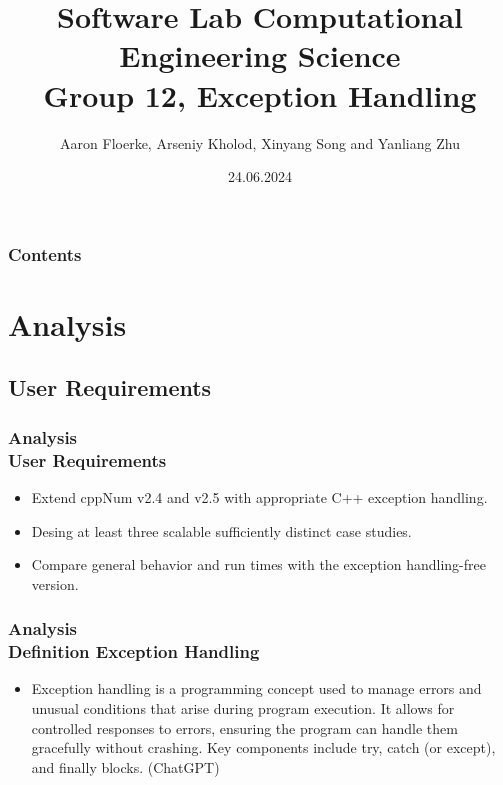 \documentclass[ucs,10pt]{beamer}
\begin{document}
\title[{\tt info@stce.rwth-aachen.de}]{\textcolor{rwth-blue}{Software Lab Computational Engineering Science} \vspace{.2cm} \\ {\small Group 12, Exception Handling}}
\author[Group 12)]{Aaron Floerke, Arseniy Kholod, Xinyang Song and Yanliang Zhu} 
\date[]{24.06.2024}

\begin{frame}[plain]
\titlepage
\end{frame}

\begin{frame}
	\frametitle{Contents}
\tableofcontents
\end{frame}

\section{Analysis}

\subsection{User Requirements}

\begin{frame}
\frametitle{Analysis \\
	\small \color{rwth-blue} User Requirements}
	\begin{itemize}
		\item Extend cppNum v2.4 and v2.5 with appropriate C++ exception handling.
		\item Desing at least three scalable sufficiently distinct case studies.
		\item Compare general behavior and run times with the exception handling-free version.
	\end{itemize}
\end{frame}

\begin{frame}
\frametitle{Analysis \\
	\small \color{rwth-blue} Definition Exception Handling}
	\begin{itemize}
		\item Exception handling is a programming concept used to manage errors and unusual conditions that arise during program execution. It allows for controlled responses to errors, ensuring the program can handle them gracefully without crashing. Key components include try, catch (or except), and finally blocks. (ChatGPT)
	\end{itemize}
\end{frame}
\end{document}

